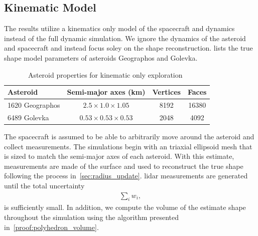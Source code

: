 \subsection{Kinematic Model}\label{sec:kinematic_exploration}
The results utilize a kinematics only model of the spacecraft and dynamics instead of the full dynamic simulation. 
We ignore the dynamics of the asteroid and spacecraft and instead focus soley on the shape reconstruction.
 lists the true shape model parameters of asteroids Geographos and Golevka.
\begin{table}[htbp]
    \centering
    \begin{tabular}{lccc}
        \toprule
        Asteroid & Semi-major axes (\si{\kilo\meter}) & Vertices & Faces\\
        \midrule
        \num{1620} Geographos & \( 2.5 \times 1.0 \times 1.05 \) & \num{8192} & \num{16380}  \\
        \num{6489} Golevka & \( 0.53 \times 0.53 \times 0.53 \)  & \num{2048} & \num{4092} \\
        \bottomrule
    \end{tabular} 
    \caption{Asteroid properties for kinematic only exploration~\label{tab:kinematic_asteroids}}
\end{table}
The spacecraft is assumed to be able to arbitrarily move around the asteroid and collect measurements.
The simulations begin with an triaxial ellipsoid mesh that is sized to match the semi-major axes of each asteroid.
With this estimate, measurements are made of the surface and used to reconstruct the true shape following the process in~\cref{sec:radius_update}.
\Gls{lidar} measurements are generated until the total uncertainty
\begin{align*}
    \sum_i w_i,
\end{align*}
is sufficiently small.
In addition, we compute the volume of the estimate shape throughout the simulation using the algorithm presented in~\cref{proof:polyhedron_volume}.

